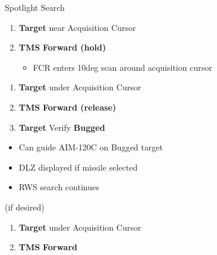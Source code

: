 \begin{checklistenumerate}
{
        \caption{Spotlight Search}
    }
    \begin{enumerate}
        \item \textbf{Target} \dotfill near Acquisition Cursor
        \item \textbf{TMS} \dotfill \textbf{Forward (hold)}
        \begin{itemize}
            \item FCR enters \pm10deg scan around acquisition cursor
        \end{itemize}
    \end{enumerate}
    \begin{enumerate}
        \item \textbf{Target} \dotfill under Acquisition Cursor
        \item \textbf{TMS} \dotfill \textbf{Forward (release)}
        \item \textbf{Target} \dotfill Verify \textbf{Bugged}
    \end{enumerate}
    \begin{itemize}
        \item Can guide AIM-120C on Bugged target
        \item DLZ displayed if missile selected
        \item RWS search continues
    \end{itemize}
     (if desired)
    \begin{enumerate}
        \item \textbf{Target} \dotfill under Acquisition Cursor
        \item \textbf{TMS} \dotfill \textbf{Forward}
    \end{enumerate}
\end{checklistenumerate}

\marginfigrestore
